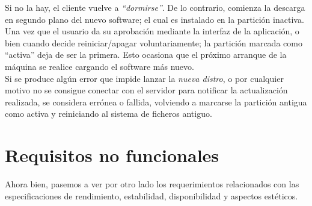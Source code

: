 Si no la hay, el cliente vuelve a \textit{``dormirse''}. De lo contrario, comienza la descarga en segundo plano del nuevo software; el cual es instalado en la partición inactiva.\\

Una vez que el usuario da su aprobación mediante la interfaz de la aplicación, o bien cuando decide reiniciar/apagar voluntariamente; la partición marcada como ``activa'' deja de ser la primera. Esto ocasiona que el próximo arranque de la máquina se realice cargando el software más nuevo.\\

Si se produce algún error que impide lanzar la \textit{nueva distro}, o por cualquier motivo no se consigue conectar con el servidor para notificar la actualización realizada, se considera errónea o fallida, volviendo a marcarse la partición antigua como activa y reiniciando al sistema de ficheros antiguo.

\section{Requisitos no funcionales}

Ahora bien, pasemos a ver por otro lado los requerimientos relacionados con las especificaciones de rendimiento, estabilidad, disponibilidad y aspectos estéticos.

